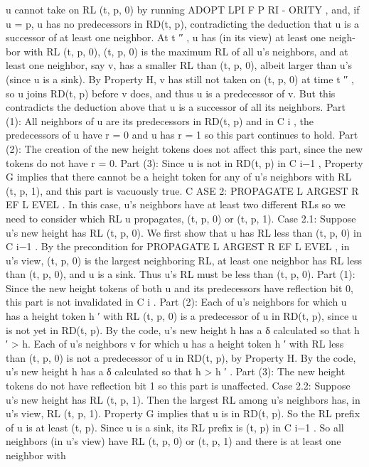 \documentclass{article}
\begin{document}
u cannot take on RL (t, p, 0) by running ADOPT LPI F P RI -
ORITY , and, if u = p, u has no predecessors in RD(t, p),
contradicting the deduction that u is a successor of at least
one neighbor. At t ′′ , u has (in its view) at least one neigh-
bor with RL (t, p, 0), (t, p, 0) is the maximum RL of all u’s
neighbors, and at least one neighbor, say v, has a smaller
RL than (t, p, 0), albeit larger than u’s (since u is a sink).
By Property H, v has still not taken on (t, p, 0) at time t ′′ , so
u joins RD(t, p) before v does, and thus u is a predecessor
of v. But this contradicts the deduction above that u is a
successor of all its neighbors.
Part (1): All neighbors of u are its predecessors in
RD(t, p) and in C i , the predecessors of u have r = 0 and
u has r = 1 so this part continues to hold.
Part (2): The creation of the new height tokens does not
affect this part, since the new tokens do not have r = 0.
Part (3): Since u is not in RD(t, p) in C i−1 , Property G
implies that there cannot be a height token for any of u’s
neighbors with RL (t, p, 1), and this part is vacuously true.
C ASE 2: PROPAGATE L ARGEST R EF L EVEL . In this
case, u’s neighbors have at least two different RLs so we
need to consider which RL u propagates, (t, p, 0) or (t, p, 1).
Case 2.1: Suppose u’s new height has RL (t, p, 0). We
first show that u has RL less than (t, p, 0) in C i−1 . By the
precondition for PROPAGATE L ARGEST R EF L EVEL , in u’s
view, (t, p, 0) is the largest neighboring RL, at least one
neighbor has RL less than (t, p, 0), and u is a sink. Thus
u’s RL must be less than (t, p, 0).
Part (1): Since the new height tokens of both u and its
predecessors have reflection bit 0, this part is not invalidated
in C i .
Part (2): Each of u’s neighbors for which u has a height
token h ′ with RL (t, p, 0) is a predecessor of u in RD(t, p),
since u is not yet in RD(t, p). By the code, u’s new height h
has a δ calculated so that h ′ > h.
Each of u’s neighbors v for which u has a height token
h ′ with RL less than (t, p, 0) is not a predecessor of u in
RD(t, p), by Property H. By the code, u’s new height h has
a δ calculated so that h > h ′ .
Part (3): The new height tokens do not have reflection bit
1 so this part is unaffected.
Case 2.2: Suppose u’s new height has RL (t, p, 1). Then
the largest RL among u’s neighbors has, in u’s view, RL
(t, p, 1). Property G implies that u is in RD(t, p). So the
RL prefix of u is at least (t, p). Since u is a sink, its RL
prefix is (t, p) in C i−1 . So all neighbors (in u’s view) have
RL (t, p, 0) or (t, p, 1) and there is at least one neighbor with
\end{document}
